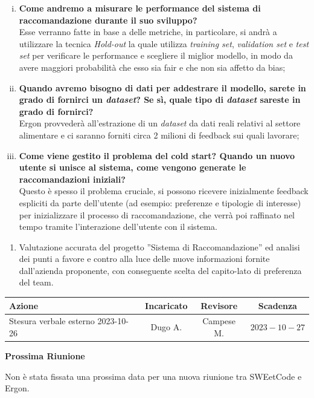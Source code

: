 \documentclass{article}
\begin{document}
\begin{paracol}{2}
\begin{enumerate}[i.]
    \item \textbf{Come andremo a misurare le performance del sistema di raccomandazione durante il suo sviluppo?}\\
    Esse verranno fatte in base a delle metriche, in particolare, si andrà a utilizzare la tecnica \textit{Hold-out} la quale utilizza \textit{training set}, \textit{validation set} e \textit{test set} per verificare le performance e scegliere il miglior modello, in modo da avere maggiori probabilità che esso sia fair e che non sia affetto da bias;
    \item \textbf{Quando avremo bisogno di dati per addestrare il modello, sarete in grado di fornirci un \textit{dataset}? Se sì, quale tipo di \textit{dataset} sareste in grado di fornirci?}\\
    Ergon provvederà all’estrazione di un \textit{dataset} da dati reali relativi al settore alimentare e ci saranno forniti circa 2 milioni di feedback sui quali lavorare;
    \item \textbf{Come viene gestito il problema del cold start? Quando un nuovo utente si unisce al sistema, come vengono generate le raccomandazioni iniziali?}\\
    Questo è spesso il problema cruciale, si possono ricevere inizialmente feedback espliciti da parte dell’utente (ad esempio: preferenze e tipologie di interesse) per inizializzare il processo di raccomandazione, che verrà poi raffinato nel tempo tramite l’interazione dell’utente con il sistema.
\end{enumerate}
\vspace{1.6cm}

\begin{enumerate}
    \item Valutazione accurata del progetto ”Sistema di Raccomandazione” ed analisi dei punti a favore e contro alla luce delle nuove informazioni fornite dall’azienda proponente, con conseguente scelta del capito-lato di preferenza del team.
\end{enumerate}


\end{paracol}

\vspace{2cm}




{\renewcommand{\arraystretch}{1.5}
\begin{tabularx}{\textwidth}{X|c|c|c}
\textbf{Azione} & \textbf{Incaricato} & \textbf{Revisore} & \textbf{Scadenza} \\
\hline
Stesura verbale esterno 2023-10-26 & Dugo A. & Campese M. & $2023-10-27$ \\
\end{tabularx}}

\vspace{2cm}


\textbf{Prossima Riunione}

Non è stata fissata una prossima data per una nuova riunione tra SWEetCode e Ergon.
\end{document}
